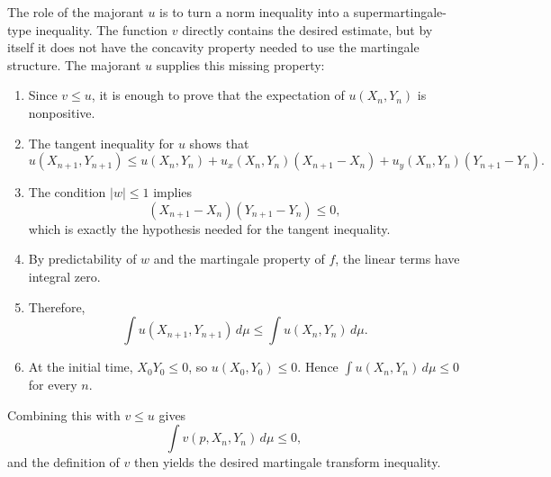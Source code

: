 \documentclass[11pt]{amsart}
\begin{document}
The role of the majorant \(u\) is to turn a norm inequality into a
supermartingale-type inequality.  The function \(v\) directly contains the
desired estimate, but by itself it does not have the concavity property needed
to use the martingale structure.  The majorant \(u\) supplies this missing
property:

\begin{enumerate}
  \item Since \(v\le u\), it is enough to prove that the expectation of
    \(u(X_n,Y_n)\) is nonpositive.
  \item The tangent inequality for \(u\) shows that
    \[
      u(X_{n+1},Y_{n+1})
        \le u(X_n,Y_n)
          + u_x(X_n,Y_n)(X_{n+1}-X_n)
          + u_y(X_n,Y_n)(Y_{n+1}-Y_n).
    \]
  \item The condition \(|w|\le 1\) implies
    \[
      (X_{n+1}-X_n)(Y_{n+1}-Y_n)\le 0,
    \]
    which is exactly the hypothesis needed for the tangent inequality.
  \item By predictability of \(w\) and the martingale property of \(f\), the
    linear terms have integral zero.
  \item Therefore,
    \[
      \int u(X_{n+1},Y_{n+1})\,d\mu
        \le
      \int u(X_n,Y_n)\,d\mu.
    \]
  \item At the initial time, \(X_0Y_0\le 0\), so \(u(X_0,Y_0)\le 0\).
    Hence \(\int u(X_n,Y_n)\,d\mu\le 0\) for every \(n\).
\end{enumerate}

Combining this with \(v\le u\) gives
\[
  \int v(p,X_n,Y_n)\,d\mu \le 0,
\]
and the definition of \(v\) then yields the desired martingale transform
inequality.
\end{document}
